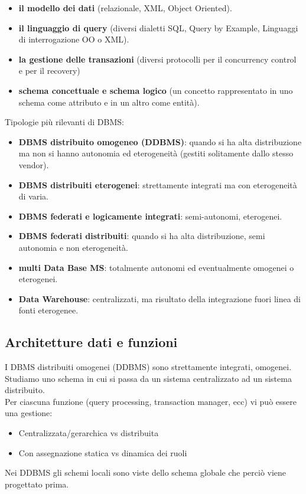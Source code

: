 \begin{itemize}
    \begin{itemize}
        \item \textbf{il modello dei dati} (relazionale, XML, Object Oriented).
        \item \textbf{il linguaggio di query} (diversi dialetti SQL, Query by Example, Linguaggi di interrogazione OO o XML).
        \item \textbf{la gestione delle transazioni} (diversi protocolli per il concurrency control e per il recovery)
        \item \textbf{schema concettuale e schema logico} (un concetto rappresentato in uno schema come attributo e in un altro come entità).
    \end{itemize}
\end{itemize}

Tipologie più rilevanti di DBMS:
\begin{itemize}
  \item \textbf{DBMS distribuito omogeneo (DDBMS)}: quando si ha alta distribuzione ma non si hanno autonomia ed eterogeneità (gestiti solitamente dallo stesso vendor).
  \item \textbf{DBMS distribuiti eterogenei}: strettamente integrati ma con eterogeneità di varia.
  \item \textbf{DBMS federati e logicamente integrati}: semi-autonomi, eterogenei.
  \item \textbf{DBMS federati distribuiti}: quando si ha alta  distribuzione, semi autonomia e non eterogeneità.
  \item \textbf{multi Data Base MS}: totalmente autonomi ed eventualmente omogenei o eterogenei.
  \item \textbf{Data Warehouse}: centralizzati, ma risultato della integrazione fuori linea di fonti eterogenee.
\end{itemize}

\subsection{Architetture dati e funzioni}
I DBMS distribuiti omogenei (DDBMS) sono strettamente integrati, omogenei. Studiamo uno schema in cui si passa da un sistema centralizzato ad un sistema distribuito.\\
Per ciascuna funzione (query processing, transaction manager, ecc) vi può essere una gestione:
\begin{itemize}
    \item Centralizzata/gerarchica vs distribuita
    \item Con assegnazione statica vs dinamica dei ruoli
\end{itemize}
Nei DDBMS gli schemi locali sono viste dello schema globale che perciò viene progettato prima.

